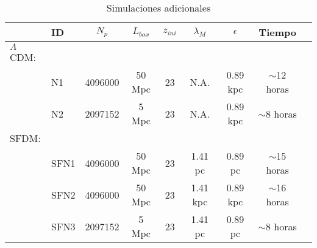 \documentclass[a4paper,openright,12pt]{book}
\begin{document}
\begin{table}[]\footnotesize
\caption{Simulaciones adicionales}
\label{Tabla 4.4}\centering%
\begin{tabular}{llccccccl}
\toprule%
&ID&$N_{p}$&$L_{box}$&$z_{ini}$&$\lambda_{M}$&$\epsilon$&Tiempo \\\toprule%
$\Lambda$CDM:\\
&N1&4096000&50 Mpc&23&N.A.&0.89 kpc&$\sim$12 horas \\
&N2&2097152&5 Mpc&23&N.A.&0.89 kpc&$\sim$8 horas\\\midrule
SFDM:\\
&SFN1&4096000&50 Mpc&23&1.41 pc&0.89 pc&$\sim$15 horas\\
&SFN2&4096000&50 Mpc&23&1.41 kpc&0.89 kpc&$\sim$16 horas\\
&SFN3&2097152&5 Mpc&23&1.41 pc&0.89 pc&$\sim$8 horas\\\bottomrule









\end{tabular}
\end{table}
\end{document}
